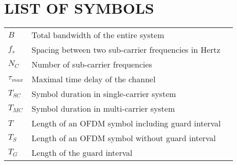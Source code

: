 \section*{LIST OF SYMBOLS}
 {}

\begin{tabularx}{0.9\textwidth}{ L{0.4} L{1.3} L{1.3} }
    $B$ & Total bandwidth of the entire system \\ %
    $f_s$ & Spacing between two sub-carrier frequencies in Hertz \\
    $N_C$ & Number of sub-carrier frequencies \\
    $\tau_{max}$ & Maximal time delay of the channel \\
    $T_{SC}$ & Symbol duration in single-carrier system \\ 
    $T_{MC}$ & Symbol duration in multi-carrier system \\
    $T$ & Length of an OFDM symbol including guard interval \\
    $T_S$ & Length of an OFDM symbol without guard interval \\
    $T_G$ & Length of the guard interval \\
\end{tabularx}

\newpage